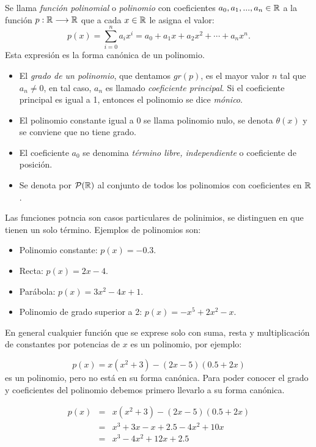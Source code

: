 
\begin{defn}
Se llama \emph{ funci\'on polinomial} o  \emph{ polinomio} con coeficientes $a_0, a_1, ..., a_n\in \mathbb{R}$ a la funci\'on $p:\mathbb{R} \longrightarrow \mathbb{R}$ que a cada $x\in \mathbb{R}$ le asigna el valor:
\[
p(x)=\sum_{i=0}^n a_ix^i=a_0+a_1x+a_2x^2+\cdots +a_nx^n.
\]
Esta expresión es la forma canónica de un polinomio.
\begin{itemize}
\item El \emph{grado de un polinomio}, que dentamos $gr(p)$, es el mayor valor $n$ tal que $a_n\ne 0$, en tal caso, $a_n$ es llamado \emph{coeficiente principal}. Si el coeficiente principal es igual a 1, entonces el polinomio se dice \emph{m\'onico}.
\item El polinomio constante igual a 0 se llama  polinomio nulo, se denota $\theta(x)$ y se conviene que no tiene grado.
\item El coeficiente $a_0$ se denomina \emph{t\'ermino libre,  independiente} o coeficiente de posición.
\item Se denota por $\mathcal{P} ( \mathbb{R})$ al conjunto de todos los polinomios con coeficientes en $\mathbb{R}$.
\end{itemize}
\end{defn}

Las funciones potncia son casos particulares de polinimios, se distinguen en que tienen un solo término.
Ejemplos de polinomios son:

\begin{itemize}
\item Polinomio constante: $p(x)=-0.3$.
\item Recta: $p(x)= 2x-4$.
\item Parábola: $p(x)= 3x^2-4x+1$.
\item Polinomio de grado superior a 2: $p(x)= -x^5+2x^2-x$.
\end{itemize}

En general cualquier función que se exprese solo con suma, resta y multiplicación de constantes por potencias de $x$ es un polinomio, por ejemplo:

$$p(x)=x(x^2+3)-(2x-5)(0.5+2x)$$
 es un polinomio, pero no está en su forma canónica. Para poder conocer el grado y coeficientes del polinomio debemos primero llevarlo a su forma canónica.
 
 \begin{eqnarray*}
 p(x)&=&x(x^2+3)-(2x-5)(0.5+2x)\\
 &=&x^3+3x-x+2.5-4x^2+10x\\
 &=&x^3-4x^2+12x+2.5
 \end{eqnarray*}
 
